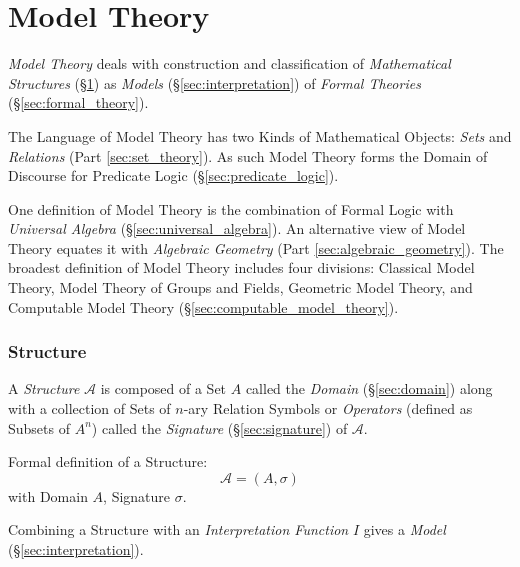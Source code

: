 \part{Model Theory}\label{sec:model_theory}\cite{hodges97}

\emph{Model Theory} deals with construction and classification of
\emph{Mathematical Structures} (\S\ref{sec:structure}) as
\emph{Models} (\S\ref{sec:interpretation}) of \emph{Formal Theories}
(\S\ref{sec:formal_theory}).

The Language of Model Theory has two Kinds of Mathematical Objects:
\emph{Sets} and \emph{Relations} (Part \ref{sec:set_theory}). As such
Model Theory forms the Domain of Discourse for Predicate Logic
(\S\ref{sec:predicate_logic}).

One definition of Model Theory is the combination of Formal Logic with
\emph{Universal Algebra} (\S\ref{sec:universal_algebra}). An
alternative view of Model Theory equates it with \emph{Algebraic
  Geometry} (Part \ref{sec:algebraic_geometry}). The broadest
definition of Model Theory includes four divisions: Classical Model
Theory, Model Theory of Groups and Fields, Geometric Model Theory, and
Computable Model Theory (\S\ref{sec:computable_model_theory}).



\section{Structure}\label{sec:structure}

A \emph{Structure} $\mathcal{A}$ is composed of a Set $A$ called the
\emph{Domain} (\S\ref{sec:domain}) along with a collection of Sets of
$n$-ary Relation Symbols or \emph{Operators} (defined as Subsets of
$A^n$) called the \emph{Signature} (\S\ref{sec:signature}) of
$\mathcal{A}$.

Formal definition of a Structure:
\[
    \mathcal{A} = (A, \sigma)
\]
with Domain $A$, Signature $\sigma$.

Combining a Structure with an \emph{Interpretation Function} $I$ gives
a \emph{Model} (\S\ref{sec:interpretation}).



